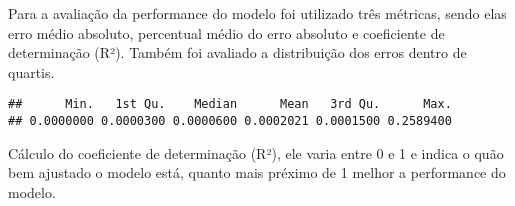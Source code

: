 \documentclass[
]{article}
\newenvironment{Shaded}{\begin{snugshade}}{\end{snugshade}}
\newcommand{\CommentTok}[1]{\textcolor[rgb]{0.56,0.35,0.01}{\textit{#1}}}
\newcommand{\DataTypeTok}[1]{\textcolor[rgb]{0.13,0.29,0.53}{#1}}
\newcommand{\DecValTok}[1]{\textcolor[rgb]{0.00,0.00,0.81}{#1}}
\newcommand{\KeywordTok}[1]{\textcolor[rgb]{0.13,0.29,0.53}{\textbf{#1}}}
\newcommand{\NormalTok}[1]{#1}
\newcommand{\OperatorTok}[1]{\textcolor[rgb]{0.81,0.36,0.00}{\textbf{#1}}}
\newcommand{\StringTok}[1]{\textcolor[rgb]{0.31,0.60,0.02}{#1}}
\begin{document}
Para a avaliação da performance do modelo foi utilizado três métricas,
sendo elas erro médio absoluto, percentual médio do erro absoluto e
coeficiente de determinação (R²). Também foi avaliado a distribuição dos
erros dentro de quartis.

\begin{Shaded}
\end{Shaded}

\begin{verbatim}
##      Min.   1st Qu.    Median      Mean   3rd Qu.      Max. 
## 0.0000000 0.0000300 0.0000600 0.0002021 0.0001500 0.2589400
\end{verbatim}

Cálculo do coeficiente de determinação (R²), ele varia entre 0 e 1 e
indica o quão bem ajustado o modelo está, quanto mais préximo de 1
melhor a performance do modelo.
\end{document}
